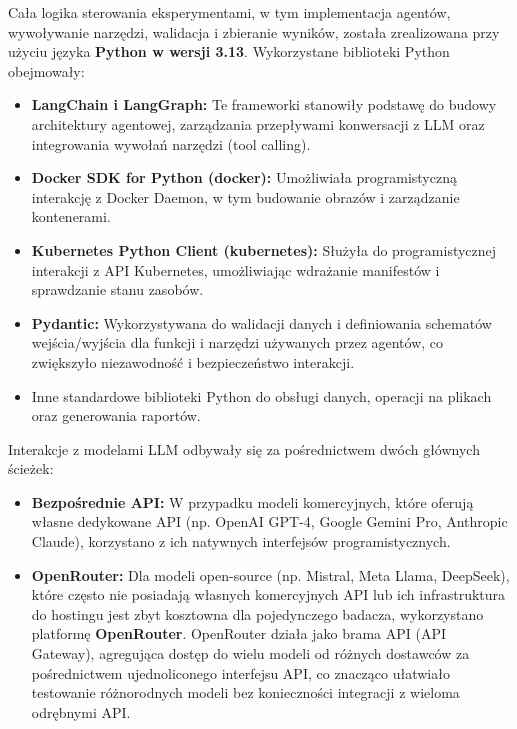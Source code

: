 Cała logika sterowania eksperymentami, w tym implementacja agentów, wywoływanie narzędzi, walidacja i zbieranie wyników, została zrealizowana przy użyciu języka \textbf{Python w wersji 3.13}. Wykorzystane biblioteki Python obejmowały:
\begin{itemize}
	\item \textbf{LangChain i LangGraph:} \cite{langchain} \cite{langgraph} Te frameworki stanowiły podstawę do budowy architektury agentowej, zarządzania przepływami konwersacji z LLM oraz integrowania wywołań narzędzi (tool calling).
	\item \textbf{Docker SDK for Python (docker):} \cite{docker_sdk_python} Umożliwiała programistyczną interakcję z Docker Daemon, w tym budowanie obrazów i zarządzanie kontenerami.
	\item \textbf{Kubernetes Python Client (kubernetes):} \cite{kubernetes_sdk_python} Służyła do programistycznej interakcji z API Kubernetes, umożliwiając wdrażanie manifestów i sprawdzanie stanu zasobów.
	\item \textbf{Pydantic:} \cite{pydantic} Wykorzystywana do walidacji danych i definiowania schematów wejścia/wyjścia dla funkcji i narzędzi używanych przez agentów, co zwiększyło niezawodność i bezpieczeństwo interakcji.
	\item Inne standardowe biblioteki Python do obsługi danych, operacji na plikach oraz generowania raportów.
\end{itemize}

Interakcje z modelami LLM odbywały się za pośrednictwem dwóch głównych ścieżek:
\begin{itemize}
	\item \textbf{Bezpośrednie API:} W przypadku modeli komercyjnych, które oferują własne dedykowane API (np. OpenAI GPT-4, Google Gemini Pro, Anthropic Claude), korzystano z ich natywnych interfejsów programistycznych.
	\item \textbf{OpenRouter:} Dla modeli open-source (np. Mistral, Meta Llama, DeepSeek), które często nie posiadają własnych komercyjnych API lub ich infrastruktura do hostingu jest zbyt kosztowna dla pojedynczego badacza, wykorzystano platformę \textbf{OpenRouter}. OpenRouter działa jako brama API (API Gateway), agregująca dostęp do wielu modeli od różnych dostawców za pośrednictwem ujednoliconego interfejsu API, co znacząco ułatwiało testowanie różnorodnych modeli bez konieczności integracji z wieloma odrębnymi API.
\end{itemize}

